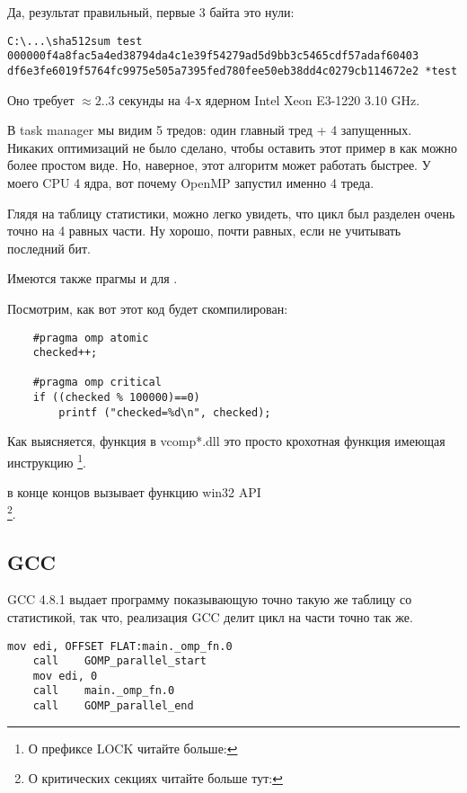 Да, результат правильный, первые 3 байта это нули:

\begin{lstlisting}
C:\...\sha512sum test
000000f4a8fac5a4ed38794da4c1e39f54279ad5d9bb3c5465cdf57adaf60403
df6e3fe6019f5764fc9975e505a7395fed780fee50eb38dd4c0279cb114672e2 *test
\end{lstlisting}

Оно требует $\approx2..3$ секунды на 4-х ядерном Intel Xeon E3-1220 3.10 GHz.

В task manager мы видим 5 тредов: один главный тред + 4 запущенных.
Никаких оптимизаций не было сделано, чтобы оставить этот пример в как можно более простом виде.
Но, наверное, этот алгоритм может работать быстрее.
У моего \ac{CPU} 4 ядра, вот почему OpenMP запустил именно 4 треда.

Глядя на таблицу статистики, можно легко увидеть, что цикл был разделен очень точно на 4 равных части.
Ну хорошо, почти равных, если не учитывать последний бит.

Имеются также прагмы и для .

Посмотрим, как вот этот код будет скомпилирован:

\begin{lstlisting}
	#pragma omp atomic
	checked++;

	#pragma omp critical
	if ((checked % 100000)==0)
		printf ("checked=%d\n", checked);
\end{lstlisting}



Как выясняется, функция  
в vcomp*.dll это просто крохотная функция имеющая инструкцию
 \footnote{О префиксе LOCK читайте больше: }.

 в конце концов вызывает функцию win32 \ac{API} \\
\footnote{О критических секциях читайте больше тут: }.

\subsection{GCC}

GCC 4.8.1 выдает программу показывающую точно такую же таблицу со статистикой, 
так что, реализация GCC делит цикл на части точно так же.

\begin{lstlisting}[caption=GCC 4.8.1]
	mov	edi, OFFSET FLAT:main._omp_fn.0
	call	GOMP_parallel_start
	mov	edi, 0
	call	main._omp_fn.0
	call	GOMP_parallel_end
\end{lstlisting}

